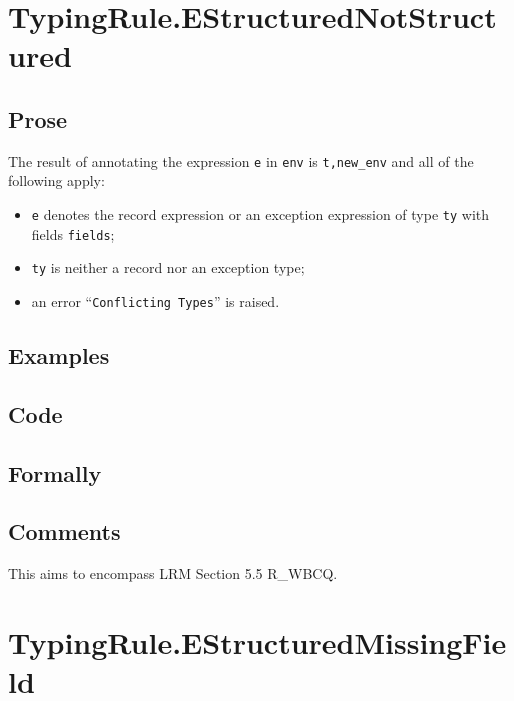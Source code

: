 \documentclass{book}
\begin{document}
\section{TypingRule.EStructuredNotStructured \label{sec:TypingRule.EStructuredNotStructured}}

  \subsection{Prose}
  The result of annotating the expression \texttt{e} in \texttt{env} is
\texttt{t,new\_env} and all of the following apply:
  \begin{itemize}
  \item \texttt{e} denotes the record expression or an exception expression of type \texttt{ty} with fields \texttt{fields};
  \item \texttt{ty} is neither a record nor an exception type;
  \item an error ``\texttt{Conflicting Types}'' is raised.
  \end{itemize}

  \subsection{Examples}

  \subsection{Code}

  \subsection{Formally}

  \subsection{Comments}

  This aims to encompass LRM Section 5.5 R\_WBCQ.

\section{TypingRule.EStructuredMissingField \label{sec:TypingRule.EStructuredMissingField}}
\end{document}
